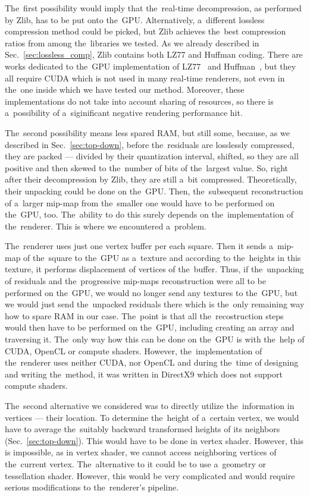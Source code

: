 The~first possibility would imply that the~real-time decompression, as performed by Zlib, has to be put onto the~GPU. Alternatively, a~different lossless compression method could be picked, but Zlib achieves the~best compression ratios from among the~libraries we tested. As we already described in Sec.~\ref{sec:lossless_comp}, Zlib contains both LZ77 and Huffman coding. There are works dedicated to the~GPU implementation of LZ77~\cite{gpuLZ77Cuda1} and Huffman~\cite{gpuHuffman1, gpuHuffmanCuda1}, but they all require CUDA which is not used in many real-time renderers, not even in the~one inside which we have tested our method. Moreover, these implementations do not take into account sharing of resources, so there is a~possibility of a~siginificant negative rendering performance hit.

The~second possibility means less spared RAM, but still some, because, as we described in Sec.~\ref{sec:top-down}, before the~residuals are losslessly compressed, they are packed --- divided by their quantization interval, shifted, so they are all positive and then skewed to the~number of bits of the~largest value. So, right after their decompression by Zlib, they are still a~bit compressed. Theoretically, their unpacking could be done on the~GPU. Then, the~subsequent reconstruction of a~larger mip-map from the~smaller one would have to be performed on the~GPU, too. The~ability to do this surely depends on the~implementation of the~renderer. This is where we encountered a~problem.

The~renderer uses just one vertex buffer per each square. Then it sends a~mip-map of the~square to the~GPU as a~texture and according to the~heights in this texture, it performs displacement of vertices of the~buffer. Thus, if the~unpacking of residuals and the~progressive mip-maps reconstruction were all to be performed on the~GPU, we would no longer send any textures to the~GPU, but we would just send the~unpacked residuals there which is the~only remaining way how to spare RAM in our case. The~point is that all the~recostruction steps would then have to be performed on the~GPU, including creating an array and traversing it. The~only way how this can be done on the~GPU is with the~help of CUDA, OpenCL or compute shaders. However, the~implementation of the~renderer uses neither CUDA, nor OpenCL and during the~time of designing and writing the~method, it was written in DirectX9 which does not support compute shaders.  

The~second alternative we considered was to directly utilize the~information in vertices --- their location. To determine the~height of a~certain vertex, we would have to average the~suitably backward transformed heights of its neighbors (Sec.~\ref{sec:top-down}). This would have to be done in vertex shader. However, this is impossible, as in vertex shader, we cannot access neighboring vertices of the~current vertex. The~alternative to it could be to use a~geometry or tessellation shader. However, this would be very complicated and would require serious modifications to the~renderer's pipeline.

